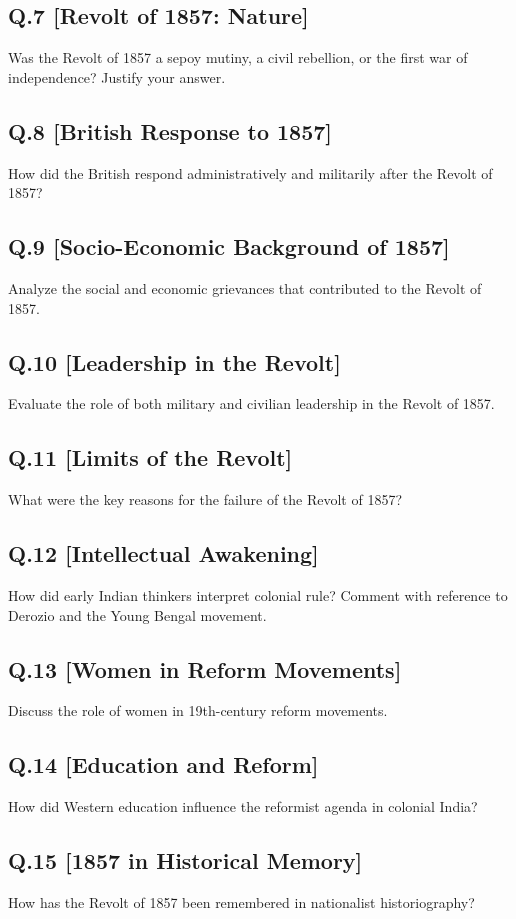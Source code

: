\subsection*{Q.7 [Revolt of 1857: Nature]}
Was the Revolt of 1857 a sepoy mutiny, a civil rebellion, or the first war of independence? Justify your answer.

\subsection*{Q.8 [British Response to 1857]}
How did the British respond administratively and militarily after the Revolt of 1857?

\subsection*{Q.9 [Socio-Economic Background of 1857]}
Analyze the social and economic grievances that contributed to the Revolt of 1857.

\subsection*{Q.10 [Leadership in the Revolt]}
Evaluate the role of both military and civilian leadership in the Revolt of 1857.

\subsection*{Q.11 [Limits of the Revolt]}
What were the key reasons for the failure of the Revolt of 1857?

\subsection*{Q.12 [Intellectual Awakening]}
How did early Indian thinkers interpret colonial rule? Comment with reference to Derozio and the Young Bengal movement.

\subsection*{Q.13 [Women in Reform Movements]}
Discuss the role of women in 19th-century reform movements.

\subsection*{Q.14 [Education and Reform]}
How did Western education influence the reformist agenda in colonial India?

\subsection*{Q.15 [1857 in Historical Memory]}
How has the Revolt of 1857 been remembered in nationalist historiography?